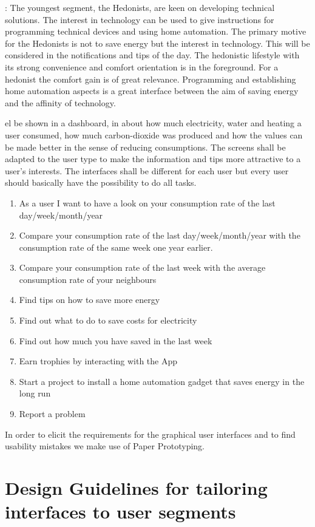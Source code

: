 :
The youngest segment, the Hedonists, are keen on developing technical solutions. The interest in technology can be used to give instructions for programming technical devices and using home automation. The primary motive for the Hedonists is not to save energy but the interest in technology. This will be considered in the notifications and tips of the day. The hedonistic lifestyle with its strong convenience and comfort orientation is in the foreground. For a hedonist the comfort gain is of great relevance. Programming and establishing home automation aspects is a great interface between the aim of saving energy and the affinity of technology.


el be shown in a dashboard, in about how much electricity, water and heating a user consumed, how much carbon-dioxide was produced and how the values can be made better in the sense of reducing consumptions. The screens shall be adapted to the user type to make the information and tips more attractive to a user's interests. The interfaces shall be different for each user but every user should basically have the possibility to do all tasks.

\begin{enumerate}
	\item As a user I want to have a look on your consumption rate of the last day/week/month/year
	\item Compare your consumption rate of the last day/week/month/year with the consumption rate of the same week one year earlier.
	\item Compare your consumption rate of the last week with the average consumption rate of your neighbours
	\item Find tips on how to save more energy
	\item Find out what to do to save costs for electricity
	\item Find out how much you have saved in the last week
	\item Earn trophies by interacting with the App
	\item Start a project to install a home automation gadget that saves energy in the long run
	\item Report a problem
\end{enumerate}



In order to elicit the requirements for the graphical user interfaces and to find usability mistakes we make use of Paper Prototyping. 


\section{Design Guidelines for tailoring interfaces to user segments}

